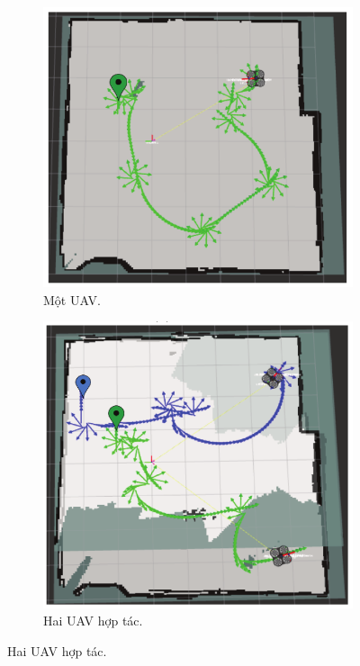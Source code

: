 \documentclass[11pt,openany]{book}
\begin{document}
\begin{algorimth}[H]
\begin{figure}[H]
\begin{subfigure}[H]{0.5\linewidth}
        \includegraphics[chiều rộng=\linewidth]{assets/3_16_a.png}
        \caption{{Một UAV.}}
        \label{fig:3.16a}
    \end{subfigure}
    \begin{subfigure}[H]{0.5\linewidth}
        \includegraphics[chiều rộng=\linewidth]{assets/3_16_b.png}
        \caption{{Hai UAV hợp tác.}}

\end{subfigure}
\end{figure}
\end{algorimth}
\end{document}
